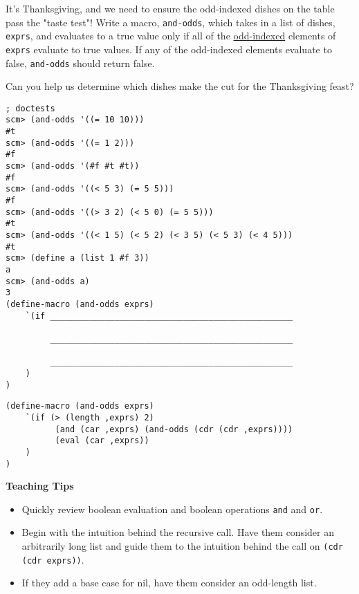 \question
It's Thanksgiving, and we need to ensure the odd-indexed dishes on the table pass the "taste test"! Write a macro, \lstinline{and-odds}, which takes in a list of dishes, \lstinline{exprs}, and evaluates to a true value only if all of the \underline{odd-indexed} elements of \lstinline{exprs} evaluate to true values. If any of the odd-indexed elements evaluate to false, \lstinline{and-odds} should return false.

Can you help us determine which dishes make the cut for the Thanksgiving feast?

\begin{lstlisting}
; doctests
scm> (and-odds '((= 10 10)))
#t
scm> (and-odds '((= 1 2)))
#f
scm> (and-odds '(#f #t #t))
#f
scm> (and-odds '((< 5 3) (= 5 5)))
#f
scm> (and-odds '((> 3 2) (< 5 0) (= 5 5)))
#t
scm> (and-odds '((< 1 5) (< 5 2) (< 3 5) (< 5 3) (< 4 5)))
#t
scm> (define a (list 1 #f 3))
a
scm> (and-odds a)
3
(define-macro (and-odds exprs)
    `(if _________________________________________________

         _________________________________________________

         _________________________________________________
    )
)
\end{lstlisting}

\begin{solution}
\begin{lstlisting}
(define-macro (and-odds exprs)
    `(if (> (length ,exprs) 2)
          (and (car ,exprs) (and-odds (cdr (cdr ,exprs))))
          (eval (car ,exprs))
    )
)
\end{lstlisting}
\end{solution}

\begin{blocksection}
\begin{guide}
\textbf{Teaching Tips}
\begin{itemize}
	\item Quickly review boolean evaluation and boolean operations \lstinline{and} and \lstinline{or}.
	\item Begin with the intuition behind the recursive call. Have them consider an arbitrarily long list and guide them to the intuition behind the call on \lstinline{(cdr (cdr exprs))}.
	\item If they add a base case for nil, have them consider an odd-length list.
\end{itemize}
\end{guide}
\end{blocksection}
